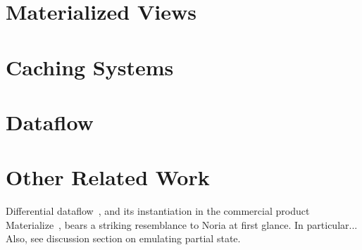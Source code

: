 
\section{Materialized Views}

\section{Caching Systems}

\section{Dataflow}

\section{Other Related Work}

\begin{comment}
http://www.vldb.org/pvldb/vol13/p1793-mcsherry.pdf
https://www.inf.ufrgs.br/prosoft/publications/2016/mertz-tse-2016-pre-print.pdf
https://people.csail.mit.edu/nickolai/papers/gupta-cachegenie.pdf
https://arxiv.org/abs/2004.14471
https://arxiv.org/abs/2001.00888
\end{comment}

Differential dataflow~\cite{naiad,differential-dataflow}, and its instantiation
in the commercial product Materialize~\cite{materialize}, bears a striking
resemblance to Noria at first glance. In particular... Also, see discussion
section on emulating partial state.
